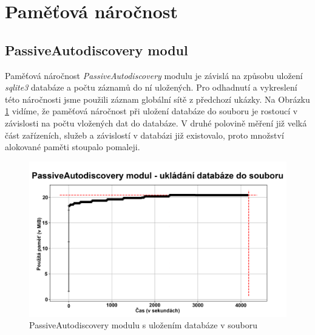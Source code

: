 \documentclass[thesis=B,czech,hidelinks]{FITthesis}[2019/03/21]
\begin{document}
    \section{Paměťová náročnost}
    \subsection{PassiveAutodiscovery modul}
    Paměťová náročnost \emph{PassiveAutodiscovery} modulu je závislá na způsobu uložení \emph{sqlite3} databáze a počtu záznamů do ní uložených. Pro odhadnutí a vykreslení této náročnosti jsme použili záznam globální sítě z předchozí ukázky. Na Obrázku \ref{PAMU1} vidíme, že paměťová náročnost při uložení databáze do souboru je rostoucí v závislosti na počtu vložených dat do databáze. V druhé polovině měření již velká část zařízeních, služeb a závislostí v databázi již existovalo, proto množství alokované paměti stoupalo pomaleji.
    \begin{figure}[h!]
        \centering
        \includegraphics[width=\textwidth]{GlobalFile.png}
        \caption[Paměťová náročnost: PassiveAutodiscovery modulu s uložením databáze v souboru]{PassiveAutodiscovery modulu s uložením databáze v souboru}
        \label{PAMU1}
    \end{figure}
    
\end{document}
